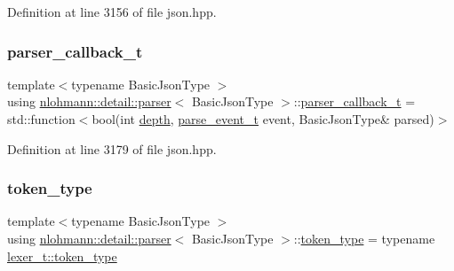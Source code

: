 Definition at line 3156 of file json.\+hpp.

\mbox{\label{classnlohmann_1_1detail_1_1parser_ad250ad4f2b4af4a497e727c963162ff1}} 
\subsubsection{\texorpdfstring{parser\+\_\+callback\+\_\+t}{parser\_callback\_t}}
{\footnotesize\ttfamily template$<$typename Basic\+Json\+Type $>$ \\
using \hyperlink{classnlohmann_1_1detail_1_1parser}{nlohmann\+::detail\+::parser}$<$ Basic\+Json\+Type $>$\+::\hyperlink{classnlohmann_1_1detail_1_1parser_ad250ad4f2b4af4a497e727c963162ff1}{parser\+\_\+callback\+\_\+t} =  std\+::function$<$bool(int \hyperlink{classnlohmann_1_1detail_1_1parser_a49dca6af052e9cab3a48dc1eaa163063}{depth}, \hyperlink{classnlohmann_1_1detail_1_1parser_a37ac88c864dda495f72cb62776b0bebe}{parse\+\_\+event\+\_\+t} event, Basic\+Json\+Type\& parsed)$>$}



Definition at line 3179 of file json.\+hpp.

\mbox{\label{classnlohmann_1_1detail_1_1parser_a21d247111b332785b7acf3f8e487d117}} 
\subsubsection{\texorpdfstring{token\+\_\+type}{token\_type}}
{\footnotesize\ttfamily template$<$typename Basic\+Json\+Type $>$ \\
using \hyperlink{classnlohmann_1_1detail_1_1parser}{nlohmann\+::detail\+::parser}$<$ Basic\+Json\+Type $>$\+::\hyperlink{classnlohmann_1_1detail_1_1parser_a21d247111b332785b7acf3f8e487d117}{token\+\_\+type} =  typename \hyperlink{classnlohmann_1_1detail_1_1lexer_a3f313cdbe187cababfc5e06f0b69b098}{lexer\+\_\+t\+::token\+\_\+type}\hspace{0.3cm}{\ttfamily [private]}}



